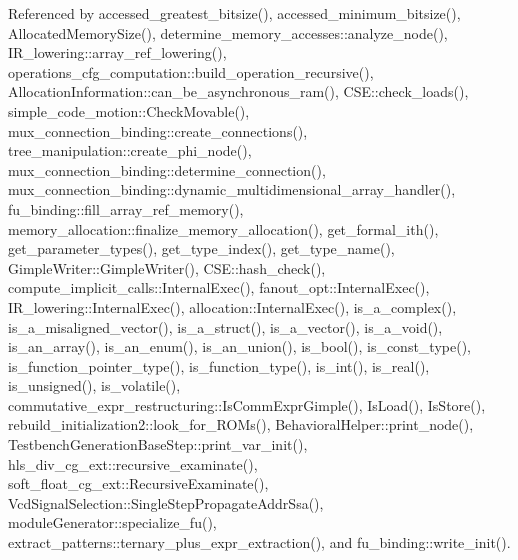 Referenced by accessed\+\_\+greatest\+\_\+bitsize(), accessed\+\_\+minimum\+\_\+bitsize(), Allocated\+Memory\+Size(), determine\+\_\+memory\+\_\+accesses\+::analyze\+\_\+node(), I\+R\+\_\+lowering\+::array\+\_\+ref\+\_\+lowering(), operations\+\_\+cfg\+\_\+computation\+::build\+\_\+operation\+\_\+recursive(), Allocation\+Information\+::can\+\_\+be\+\_\+asynchronous\+\_\+ram(), C\+S\+E\+::check\+\_\+loads(), simple\+\_\+code\+\_\+motion\+::\+Check\+Movable(), mux\+\_\+connection\+\_\+binding\+::create\+\_\+connections(), tree\+\_\+manipulation\+::create\+\_\+phi\+\_\+node(), mux\+\_\+connection\+\_\+binding\+::determine\+\_\+connection(), mux\+\_\+connection\+\_\+binding\+::dynamic\+\_\+multidimensional\+\_\+array\+\_\+handler(), fu\+\_\+binding\+::fill\+\_\+array\+\_\+ref\+\_\+memory(), memory\+\_\+allocation\+::finalize\+\_\+memory\+\_\+allocation(), get\+\_\+formal\+\_\+ith(), get\+\_\+parameter\+\_\+types(), get\+\_\+type\+\_\+index(), get\+\_\+type\+\_\+name(), Gimple\+Writer\+::\+Gimple\+Writer(), C\+S\+E\+::hash\+\_\+check(), compute\+\_\+implicit\+\_\+calls\+::\+Internal\+Exec(), fanout\+\_\+opt\+::\+Internal\+Exec(), I\+R\+\_\+lowering\+::\+Internal\+Exec(), allocation\+::\+Internal\+Exec(), is\+\_\+a\+\_\+complex(), is\+\_\+a\+\_\+misaligned\+\_\+vector(), is\+\_\+a\+\_\+struct(), is\+\_\+a\+\_\+vector(), is\+\_\+a\+\_\+void(), is\+\_\+an\+\_\+array(), is\+\_\+an\+\_\+enum(), is\+\_\+an\+\_\+union(), is\+\_\+bool(), is\+\_\+const\+\_\+type(), is\+\_\+function\+\_\+pointer\+\_\+type(), is\+\_\+function\+\_\+type(), is\+\_\+int(), is\+\_\+real(), is\+\_\+unsigned(), is\+\_\+volatile(), commutative\+\_\+expr\+\_\+restructuring\+::\+Is\+Comm\+Expr\+Gimple(), Is\+Load(), Is\+Store(), rebuild\+\_\+initialization2\+::look\+\_\+for\+\_\+\+R\+O\+Ms(), Behavioral\+Helper\+::print\+\_\+node(), Testbench\+Generation\+Base\+Step\+::print\+\_\+var\+\_\+init(), hls\+\_\+div\+\_\+cg\+\_\+ext\+::recursive\+\_\+examinate(), soft\+\_\+float\+\_\+cg\+\_\+ext\+::\+Recursive\+Examinate(), Vcd\+Signal\+Selection\+::\+Single\+Step\+Propagate\+Addr\+Ssa(), module\+Generator\+::specialize\+\_\+fu(), extract\+\_\+patterns\+::ternary\+\_\+plus\+\_\+expr\+\_\+extraction(), and fu\+\_\+binding\+::write\+\_\+init().

